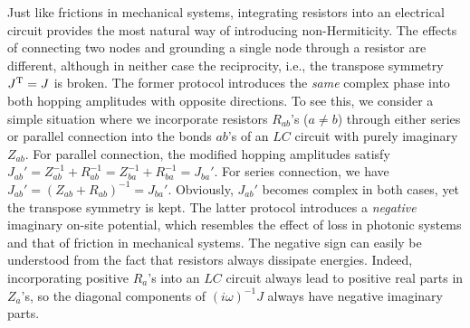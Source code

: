 \documentclass{tADP2e}
\theoremstyle{plain}
\theoremstyle{plain}
\theoremstyle{definition}
\begin{document}
\vspace{3pt}
\noindent
Just like frictions in mechanical systems, integrating resistors into an electrical circuit provides the most natural way of introducing non-Hermiticity. The effects of connecting two nodes and grounding a single node through a resistor are different, although in neither case the reciprocity, i.e., the transpose symmetry $J^{\rm T}=J$ is broken. The former protocol introduces the \emph{same} complex phase into both hopping amplitudes with opposite directions. To see this, we consider a simple situation where we incorporate resistors $R_{ab}$'s ($a\neq b$) through either series or parallel connection into the bonds $ab$'s of an $LC$ circuit with purely imaginary $Z_{ab}$. For parallel connection, the modified hopping amplitudes satisfy $J_{ab}'=Z_{ab}^{-1}+R_{ab}^{-1}=Z_{ba}^{-1}+R_{ba}^{-1}=J_{ba}'$. For series connection, we have $J_{ab}'=(Z_{ab}+R_{ab})^{-1}=J_{ba}'$. Obviously, $J_{ab}'$ becomes complex in both cases, yet the transpose symmetry is kept. The latter protocol introduces a \emph{negative} imaginary on-site potential, which resembles the effect of loss in photonic systems and that of friction in mechanical systems. The negative sign can easily be understood from the fact that resistors always dissipate energies. 
Indeed, incorporating positive $R_a$'s  into an $LC$ circuit always lead to positive real parts in $Z_a$'s, 
so the diagonal components of $(i\omega)^{-1}J$ always have negative imaginary parts.  
\end{document}
